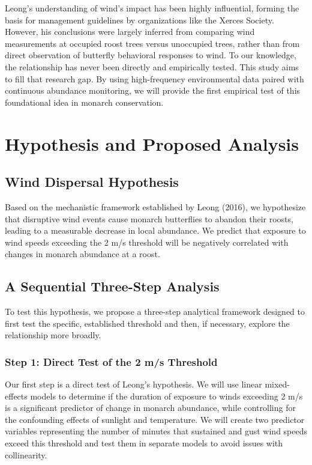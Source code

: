Leong's understanding of wind's impact has been highly influential, forming the basis for management guidelines by organizations like the Xerces Society. However, his conclusions were largely inferred from comparing wind measurements at occupied roost trees versus unoccupied trees, rather than from direct observation of butterfly behavioral responses to wind. To our knowledge, the relationship has never been directly and empirically tested. This study aims to fill that research gap. By using high-frequency environmental data paired with continuous abundance monitoring, we will provide the first empirical test of this foundational idea in monarch conservation.

\section{Hypothesis and Proposed Analysis}

\subsection{Wind Dispersal Hypothesis}

Based on the mechanistic framework established by Leong (2016), we hypothesize that disruptive wind events cause monarch butterflies to abandon their roosts, leading to a measurable decrease in local abundance. We predict that exposure to wind speeds exceeding the 2 m/s threshold will be negatively correlated with changes in monarch abundance at a roost.

\subsection{A Sequential Three-Step Analysis}

To test this hypothesis, we propose a three-step analytical framework designed to first test the specific, established threshold and then, if necessary, explore the relationship more broadly.

\subsubsection{Step 1: Direct Test of the 2 m/s Threshold}

Our first step is a direct test of Leong's hypothesis. We will use linear mixed-effects models to determine if the duration of exposure to winds exceeding 2 m/s is a significant predictor of change in monarch abundance, while controlling for the confounding effects of sunlight and temperature. We will create two predictor variables representing the number of minutes that sustained and gust wind speeds exceed this threshold and test them in separate models to avoid issues with collinearity.

